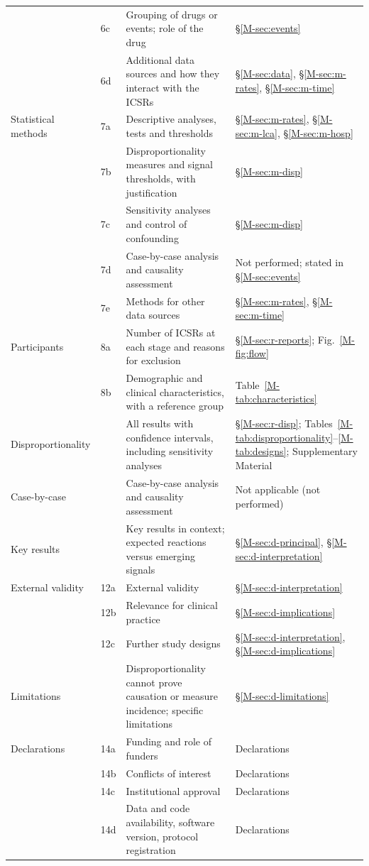 \documentclass[10pt]{article}
\newcommand{\Loc}[1]{\S\ref{M-#1}}
\begin{document}
\begin{longtable}{@{}>{\raggedright\arraybackslash}p{2.6cm}>{\raggedright\arraybackslash}p{0.8cm}>{\raggedright\arraybackslash}p{8.4cm}>{\raggedright\arraybackslash}p{3.4cm}@{}}
 & 6c & Grouping of drugs or events; role of the drug & \Loc{sec:events} \\
 & 6d & Additional data sources and how they interact with the ICSRs & \Loc{sec:data}, \Loc{sec:m-rates}, \Loc{sec:m-time} \\
Statistical methods & 7a & Descriptive analyses, tests and thresholds & \Loc{sec:m-rates}, \Loc{sec:m-lca}, \Loc{sec:m-hosp} \\
 & 7b & Disproportionality measures and signal thresholds, with justification & \Loc{sec:m-disp} \\
 & 7c & Sensitivity analyses and control of confounding & \Loc{sec:m-disp} \\
 & 7d & Case-by-case analysis and causality assessment & Not performed; stated in \Loc{sec:events} \\
 & 7e & Methods for other data sources & \Loc{sec:m-rates}, \Loc{sec:m-time} \\
Participants & 8a & Number of ICSRs at each stage and reasons for exclusion & \Loc{sec:r-reports}; Fig.~\ref{M-fig:flow} \\
 & 8b & Demographic and clinical characteristics, with a reference group & Table~\ref{M-tab:characteristics} \\
Disproportionality & 9 & All results with confidence intervals, including sensitivity analyses & \Loc{sec:r-disp}; Tables~\ref{M-tab:disproportionality}--\ref{M-tab:designs}; Supplementary Material \\
Case-by-case & 10 & Case-by-case analysis and causality assessment & Not applicable (not performed) \\
Key results & 11 & Key results in context; expected reactions versus emerging signals & \Loc{sec:d-principal}, \Loc{sec:d-interpretation} \\
External validity & 12a & External validity & \Loc{sec:d-interpretation} \\
 & 12b & Relevance for clinical practice & \Loc{sec:d-implications} \\
 & 12c & Further study designs & \Loc{sec:d-interpretation}, \Loc{sec:d-implications} \\
Limitations & 13 & Disproportionality cannot prove causation or measure incidence; specific limitations & \Loc{sec:d-limitations} \\
Declarations & 14a & Funding and role of funders & Declarations \\
 & 14b & Conflicts of interest & Declarations \\
 & 14c & Institutional approval & Declarations \\
 & 14d & Data and code availability, software version, protocol registration & Declarations \\
\end{longtable}
\end{document}
